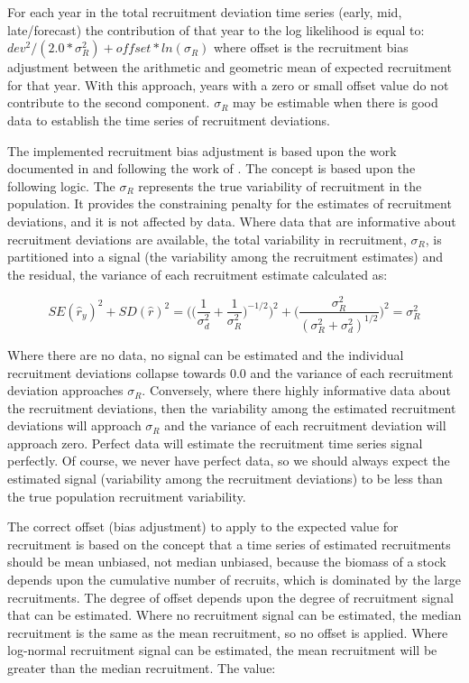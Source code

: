 \hypertarget{RecBias}{}
For each year in the total recruitment deviation time series (early, mid, late/forecast) the contribution of that year to the log likelihood is equal to: $dev^2/(2.0*\sigma^2_R)+offset*ln(\sigma_R)$ where offset is the recruitment bias adjustment between the arithmetic and geometric mean of expected recruitment for that year. With this approach, years with a zero or small offset value do not contribute to the second component. $\sigma_R$ may be estimable when there is good data to establish the time series of recruitment deviations.

The implemented recruitment bias adjustment is based upon the work documented in \citet{methot-adjusting-2011} and following the work of \citet{maunder-estimation-2003}. The concept is based upon the following logic. The $\sigma_R$ represents the true variability of recruitment in the population. It provides the constraining penalty for the estimates of recruitment deviations, and it is not affected by data. Where data that are informative about recruitment deviations are available, the total variability in recruitment, $\sigma_R$, is partitioned into a signal (the variability among the recruitment estimates) and the residual, the variance of each recruitment estimate calculated as:

\begin{equation}
SE(\hat{r}_y)^2 + SD(\hat{r})^2=\Bigg( \bigg( \frac{1}{\sigma^2_d}+\frac{1}{\sigma^2_R}\bigg)^{-1/2}\Bigg)^2+\Bigg( \frac{\sigma^2_R}{(\sigma^2_R+\sigma^2_d)^{1/2}}\Bigg)^2=\sigma^2_R
\end{equation}

Where there are no data, no signal can be estimated and the individual recruitment deviations collapse towards 0.0 and the variance of each recruitment deviation approaches $\sigma_R$. Conversely, where there highly informative data about the recruitment deviations, then the variability among the estimated recruitment deviations will approach $\sigma_R$ and the variance of each recruitment deviation will approach zero. Perfect data will estimate the recruitment time series signal perfectly. Of course, we never have perfect data, so we should always expect the estimated signal (variability among the recruitment deviations) to be less than the true population recruitment variability.

The correct offset (bias adjustment) to apply to the expected value for recruitment is based on the concept that a time series of estimated recruitments should be mean unbiased, not median unbiased, because the biomass of a stock depends upon the cumulative number of recruits, which is dominated by the large recruitments. The degree of offset depends upon the degree of recruitment signal that can be estimated. Where no recruitment signal can be estimated, the median recruitment is the same as the mean recruitment, so no offset is applied. Where log-normal recruitment signal can be estimated, the mean recruitment will be greater than the median recruitment. The value:

